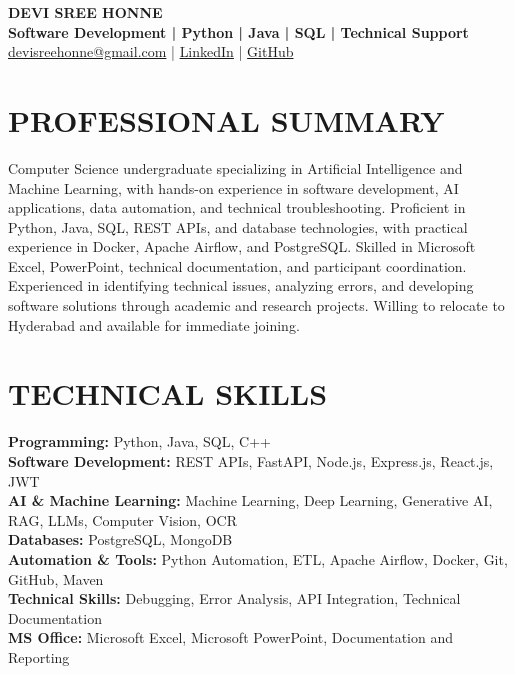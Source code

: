 \documentclass[a4paper,10pt]{article}
\begin{document}
\begin{center}
    {\LARGE \textbf{DEVI SREE HONNE}}\\[4pt]

    {\normalsize
    \textbf{Software Development | Python | Java | SQL | Technical Support}
    }\\[5pt]

    \small
    \href{mailto:devisreehonne@gmail.com}
    {devisreehonne@gmail.com}
    \quad | \quad
    \href{https://www.linkedin.com/in/devisreehonne/}
    {LinkedIn}
    \quad | \quad
    \href{https://github.com/devhonne}
    {GitHub}
\end{center}

\section*{PROFESSIONAL SUMMARY}

Computer Science undergraduate specializing in Artificial
Intelligence and Machine Learning, with hands-on experience
in software development, AI applications, data automation,
and technical troubleshooting. Proficient in Python, Java,
SQL, REST APIs, and database technologies, with practical
experience in Docker, Apache Airflow, and PostgreSQL.
Skilled in Microsoft Excel, PowerPoint, technical documentation,
and participant coordination. Experienced in identifying
technical issues, analyzing errors, and developing software
solutions through academic and research projects. Willing
to relocate to Hyderabad and available for immediate joining.

\section*{TECHNICAL SKILLS}

\textbf{Programming:} Python, Java, SQL, C++\\
\textbf{Software Development:} REST APIs, FastAPI, Node.js,
Express.js, React.js, JWT\\
\textbf{AI \& Machine Learning:} Machine Learning, Deep Learning,
Generative AI, RAG, LLMs, Computer Vision, OCR\\
\textbf{Databases:} PostgreSQL, MongoDB\\
\textbf{Automation \& Tools:} Python Automation, ETL,
Apache Airflow, Docker, Git, GitHub, Maven\\
\textbf{Technical Skills:} Debugging, Error Analysis,
API Integration, Technical Documentation\\
\textbf{MS Office:} Microsoft Excel, Microsoft PowerPoint,
Documentation and Reporting
\end{document}
